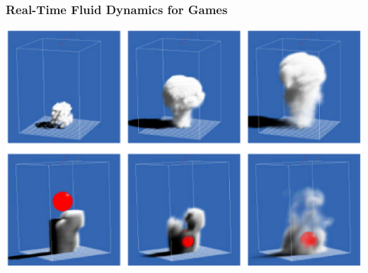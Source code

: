 \documentclass[a4paper,10pt]{article}
\begin{document}
\subsubsection{Real-Time Fluid Dynamics for Games}
    \begin{center}
	\includegraphics[scale=0.5]{JosStam1.ps}
    \end{center}
\end{document}

